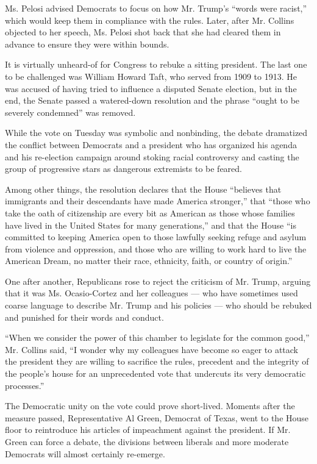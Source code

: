 Ms. Pelosi advised Democrats to focus on how Mr. Trump's ``words were
racist,'' which would keep them in compliance with the rules. Later,
after Mr. Collins objected to her speech, Ms. Pelosi shot back that she
had cleared them in advance to ensure they were within bounds.

It is virtually unheard-of for Congress to rebuke a sitting president.
The last one to be challenged was William Howard Taft, who served from
1909 to 1913. He was accused of having tried to influence a disputed
Senate election, but in the end, the Senate passed a watered-down
resolution and the phrase ``ought to be severely condemned'' was
removed.

While the vote on Tuesday was symbolic and nonbinding, the debate
dramatized the conflict between Democrats and a president who has
organized his agenda and his re-election campaign around stoking racial
controversy and casting the group of progressive stars as dangerous
extremists to be feared.

Among other things, the resolution declares that the House ``believes
that immigrants and their descendants have made America stronger,'' that
``those who take the oath of citizenship are every bit as American as
those whose families have lived in the United States for many
generations,'' and that the House ``is committed to keeping America open
to those lawfully seeking refuge and asylum from violence and
oppression, and those who are willing to work hard to live the American
Dream, no matter their race, ethnicity, faith, or country of origin.''

One after another, Republicans rose to reject the criticism of Mr.
Trump, arguing that it was Ms. Ocasio-Cortez and her colleagues --- who
have sometimes used coarse language to describe Mr. Trump and his
policies --- who should be rebuked and punished for their words and
conduct.

``When we consider the power of this chamber to legislate for the common
good,'' Mr. Collins said, ``I wonder why my colleagues have become so
eager to attack the president they are willing to sacrifice the rules,
precedent and the integrity of the people's house for an unprecedented
vote that undercuts its very democratic processes.''

The Democratic unity on the vote could prove short-lived. Moments after
the measure passed, Representative Al Green, Democrat of Texas, went to
the House floor to reintroduce his articles of impeachment against the
president. If Mr. Green can force a debate, the divisions between
liberals and more moderate Democrats will almost certainly re-emerge.

